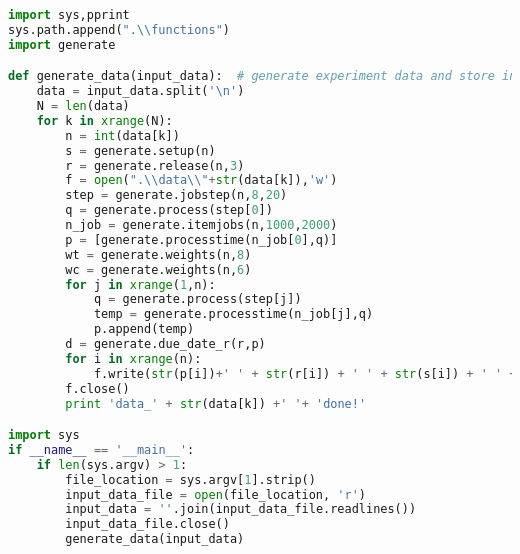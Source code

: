 \begin{lstlisting}[language = Python]
import sys,pprint
sys.path.append(".\\functions")
import generate

def generate_data(input_data):	# generate experiment data and store in the data file
	data = input_data.split('\n')
	N = len(data)
	for k in xrange(N):
		n = int(data[k])
		s = generate.setup(n)
		r = generate.release(n,3)
		f = open(".\\data\\"+str(data[k]),'w')
		step = generate.jobstep(n,8,20)
		q = generate.process(step[0])
		n_job = generate.itemjobs(n,1000,2000)
		p = [generate.processtime(n_job[0],q)]
		wt = generate.weights(n,8)
		wc = generate.weights(n,6)
		for j in xrange(1,n):
			q = generate.process(step[j])
			temp = generate.processtime(n_job[j],q)
			p.append(temp)
		d = generate.due_date_r(r,p)
		for i in xrange(n):
			f.write(str(p[i])+' ' + str(r[i]) + ' ' + str(s[i]) + ' ' + str(d[i]) + ' ' + str(wt[i]) + ' ' + str(wc[i]) + '\n')
		f.close()
		print 'data_' + str(data[k]) +' '+ 'done!'

import sys
if __name__ == '__main__':
	if len(sys.argv) > 1:
		file_location = sys.argv[1].strip()
		input_data_file = open(file_location, 'r')
		input_data = ''.join(input_data_file.readlines())
		input_data_file.close()
		generate_data(input_data)
\end{lstlisting}